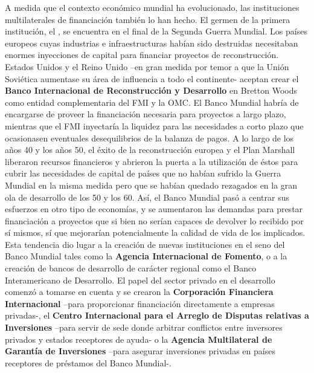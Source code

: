 \documentclass{nuevotema}
\begin{document}
A medida que el contexto económico mundial ha evolucionado, las instituciones multilaterales de financiación también lo han hecho. El germen de la primera institución, el , se encuentra en el final de la Segunda Guerra Mundial. Los países europeos cuyas industrias e infraestructuras habían sido destruidas necesitaban enormes inyecciones de capital para financiar proyectos de reconstrucción. Estados Unidos y el Reino Unido --en gran medida por temor a que la Unión Soviética aumentase su área de influencia a todo el continente- aceptan crear el \textbf{Banco Internacional de Reconstrucción y Desarrollo} en Bretton Woods como entidad complementaria del FMI y la OMC. El Banco Mundial habría de encargarse de proveer la financiación necesaria para proyectos a largo plazo, mientras que el FMI inyectaría la liquidez para las necesidades a corto plazo que ocasionasen eventuales desequilibrios de la balanza de pagos. A lo largo de los años 40 y los años 50, el éxito de la reconstrucción europea y el Plan Marshall liberaron recursos financieros y abrieron la puerta a la utilización de éstos para cubrir las necesidades de capital de países que no habían sufrido la Guerra Mundial en la misma medida pero que se habían quedado rezagados en la gran ola de desarrollo de los 50 y los 60. Así, el Banco Mundial pasó a centrar sus esfuerzos en otro tipo de economías, y se aumentaron las demandas para prestar financiación a proyectos que si bien no serían capaces de devolver lo recibido por sí mismos, sí que mejorarían potencialmente la calidad de vida de los implicados. Esta tendencia dio lugar a la creación de nuevas instituciones en el seno del Banco Mundial tales como la \textbf{Agencia Internacional de Fomento}, o a la creación de bancos de desarrollo de carácter regional como el Banco Interamericano de Desarrollo. El papel del sector privado en el desarrollo comenzó a tomarse en cuenta y se crearon la \textbf{Corporación Financiera Internacional} --para proporcionar financiación directamente a empresas privadas-, el \textbf{Centro Internacional para el Arreglo de Disputas relativas a Inversiones} --para servir de sede donde arbitrar conflictos entre inversores privados y estados receptores de ayuda- o la \textbf{Agencia Multilateral de Garantía de Inversiones} --para asegurar inversiones privadas en países receptores de préstamos del Banco Mundial-. 
\end{document}
